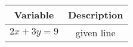 \begin{tabular}[12pt]{ |c| c|}
    \hline
    \textbf{Variable} & \textbf{Description}\\ 
    \hline
	$2x+3y=9$ & given line\\
   \hline

    \end{tabular}
